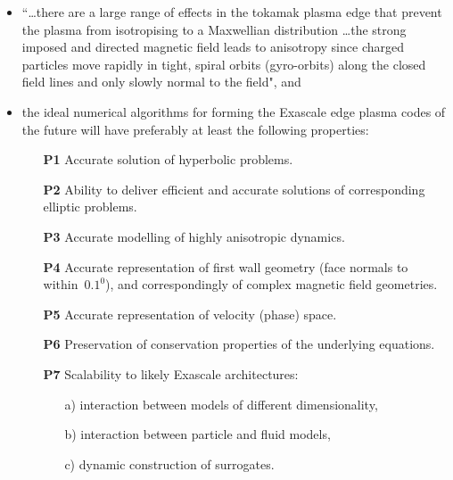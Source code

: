 \begin{itemize}
\item  ``\ldots there are a large range of effects in the 
tokamak plasma edge that prevent the plasma from isotropising to a Maxwellian 
distribution \ldots the strong 
imposed and directed magnetic field leads to anisotropy since charged particles 
move rapidly in tight, spiral orbits (gyro-orbits) along the closed field lines 
and only slowly normal to the field", and


\item the ideal numerical algorithms for forming the Exascale edge plasma codes of 
the future will have preferably at least the following properties:
\begin{itemize}
\item[{\bf P1}] Accurate solution of hyperbolic problems.
\item[{\bf P2}] Ability to deliver efficient and accurate solutions of corresponding 
elliptic problems.
\item[{\bf P3}] Accurate modelling of highly anisotropic dynamics. 
\item[{\bf P4}] Accurate representation of first wall geometry (face normals to
within~$0.1^{0}$), and correspondingly of complex magnetic field geometries.
\item[{\bf P5}] Accurate representation of velocity (phase) space.
\item[{\bf P6}] Preservation of conservation properties of the underlying equations.
\item[{\bf P7}] Scalability to likely Exascale architectures:

\begin{itemize}
\item[a)] interaction between models of different dimensionality,
\item[b)] interaction between particle and fluid models,
\item[c)] dynamic construction of surrogates.
\end{itemize}


\end{itemize}
\end{itemize}
